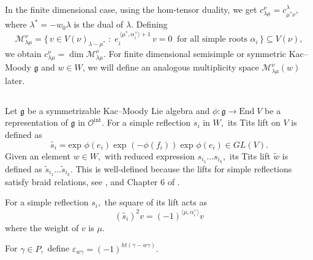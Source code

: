 \documentclass[12pt,reqno]{amsart}
\theoremstyle{plain}
\theoremstyle{definition}
\theoremstyle{plain}
\newcommand{\catoint}{\mathcal{O}^{\mathrm{int}}}
\newcommand{\lie}{\mathfrak}
\newcommand{\lr}{c_{\lambda\mu}^\nu}
\begin{document}
In the finite dimensional case, using the hom-tensor duality, we get $c_{\lambda\mu}^{\nu}=c_{\mu^*\nu}^{\lambda},$ where $\lambda^*=-w_0\lambda$ is the dual of $\lambda.$
Defining \begin{equation}\label{eq:mult}
    \mathcal{M}_{\lambda\mu}^{\nu}= \bigl\{\,v\in V(\nu)_{\lambda-\mu^*}\;:\;
    e_i^{\,\langle\mu^*,\alpha_i^\vee\rangle+1}\,v=0\ \text{ for all simple roots } \alpha_i\,\bigr\} \subseteq V(\nu),
\end{equation}
we obtain $\lr=\dim\mathcal{M}_{\lambda\mu}^{\nu}.$
For finite dimensional semisimple or symmetric Kac--Moody $\lie g$ and $w\in W$, we will define an analogous multiplicity space $\mathcal{M}_{\lambda\mu}^{\nu}(w)$ later.

\subsection{}
Let $\lie g$ be a symmetrizable Kac--Moody Lie algebra and $\phi: \lie g\to \text{End}\;V$ be a representation of $\lie g$ in $\catoint$. For a simple reflection $s_i$ in $W,$ its Tits lift on $V$ is defined as $$\widetilde{s_i}= \text{exp }\phi(e_i)\; \text{exp }(-\phi(f_i))\; \text{exp }\phi(e_i)\in GL(V).$$ Given an element $w\in W,$ with reduced expression $s_{i_1}\ldots s_{i_k},$ its Tits lift $\widetilde{w}$ is defined as $\widetilde{s}_{i_1}\ldots\widetilde{s}_{i_k}.$ This is well-defined because the lifts for simple reflections satisfy braid relations, see \cite{T1}, \cite{S1} and Chapter 6 of \cite{Kum3}.

For a simple reflection $s_i,$ the square of its lift acts as \begin{equation}\label{eq:simplelift}
    (\widetilde{s_i})^2v=(-1)^{\langle \mu,\alpha_i^\vee\rangle}v 
\end{equation} where the weight of $v$ is $\mu.$

For $\gamma\in P,$ define $\varepsilon_{w\gamma}=(-1)^{ht(\gamma-w\gamma)}.$
\end{document}

